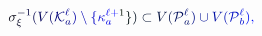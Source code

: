 \documentclass[12pt]{article}
\begin{document}
\makeatletter
\renewcommand*{\@textcolor}[3]{%
  \protect\leavevmode
  \begingroup
    \color#1{#2}#3%
  \endgroup
}
\makeatother
\begin{displaymath}
\mathcolor[RGB]{0,0,15}{\sigma} _ { \mathcolor[RGB]{0,0,30}{\xi} } ^ { \mathcolor[RGB]{0,0,45}{-} \mathcolor[RGB]{0,0,60}{1} } \mathcolor[RGB]{0,0,75}{(} \mathcolor[RGB]{0,0,90}{V} \mathcolor[RGB]{0,0,105}{(} \mathcal { \mathcolor[RGB]{0,0,120}{K} } _ { \mathcolor[RGB]{0,0,135}{a} } ^ { \mathcolor[RGB]{0,0,150}{\ell} } \mathcolor[RGB]{0,0,165}{)} \mathcolor[RGB]{0,0,180}{\setminus} \mathcolor[RGB]{0,0,195}{\{} \mathcolor[RGB]{0,0,210}{\kappa} _ { \mathcolor[RGB]{0,0,225}{a} } ^ { \mathcolor[RGB]{0,0,240}{\ell} \mathcolor[RGB]{0,0,255}{+} \mathcolor[RGB]{0,15,0}{1} } \mathcolor[RGB]{0,15,15}{\}} \mathcolor[RGB]{0,15,30}{)} \mathcolor[RGB]{0,15,45}{\subset} \mathcolor[RGB]{0,15,60}{V} \mathcolor[RGB]{0,15,75}{(} \mathcal { \mathcolor[RGB]{0,15,90}{P} } _ { \mathcolor[RGB]{0,15,105}{a} } ^ { \mathcolor[RGB]{0,15,120}{\ell} } \mathcolor[RGB]{0,15,135}{)} \mathcolor[RGB]{0,15,150}{\cup} \mathcolor[RGB]{0,15,165}{V} \mathcolor[RGB]{0,15,180}{(} \mathcal { \mathcolor[RGB]{0,15,195}{P} } _ { \mathcolor[RGB]{0,15,210}{b} } ^ { \mathcolor[RGB]{0,15,225}{\ell} } \mathcolor[RGB]{0,15,240}{)} \mathcolor[RGB]{0,15,255}{,}
\end{displaymath}
\end{document}
